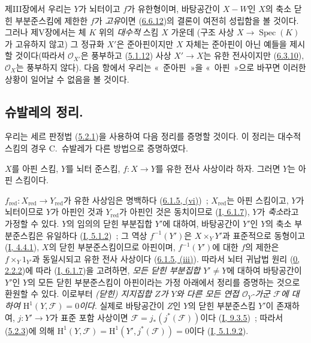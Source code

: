 \begin{remark}[6.6.13]
\label{II.6.6.13-ko}
제III장에서 우리는 $Y$가 뇌터이고 $f$가 유한형이며, 바탕공간이
$X-W$인 $X$의 축소 닫힌 부분준스킴에 제한한 $f$가 \emph{고유}이면
(\hyperref[II.6.6.12-ko]{6.6.12})의 결론이 여전히 성립함을 볼 것이다.
그러나 제V장에서는 체 $K$ 위의 \emph{대수적} 스킴 $X$ 가운데 (구조 사상
$X\to\operatorname{Spec}(K)$가 고유하지 않고) 그 정규화 $X'$은
준아핀이지만 $X$ 자체는 준아핀이 아닌 예들을 제시할 것이다(따라서
$\mathcal{O}_{X'}$은 풍부하고
(\hyperref[II.5.1.12-ko]{5.1.12}) 사상 $X'\to X$는 유한 전사이지만
(\hyperref[II.6.3.10-ko]{6.3.10}), $\mathcal{O}_X$는 풍부하지 않다).
다음 항에서 우리는 «~준아핀~»을 «~아핀~»으로 바꾸면 이러한 상황이
일어날 수 없음을 볼 것이다.
\end{remark}

\subsection{슈발레의 정리.}
\label{subsection:II.6.7-ko}

우리는 세르 판정법 (\hyperref[II.5.2.1-ko]{5.2.1})을 사용하여 다음
정리를 증명할 것이다. 이 정리는 대수적 스킴의 경우 C.~슈발레가 다른
방법으로 증명하였다.


\begin{theorem}[6.7.1]
\label{II.6.7.1-ko}
$X$를 아핀 스킴, $Y$를 뇌터 준스킴, $f:X\to Y$를 유한 전사 사상이라
하자. 그러면 $Y$는 아핀 스킴이다.
\end{theorem}

$f_{\mathrm{red}}:X_{\mathrm{red}}\to Y_{\mathrm{red}}$가 유한 사상임은
명백하다 (\hyperref[II.6.1.5-ko]{6.1.5, (vi)})~; $X_{\mathrm{red}}$는 아핀
스킴이고, $Y$가 뇌터이므로 $Y$가 아핀인 것과 $Y_{\mathrm{red}}$가 아핀인
것은 동치이므로 (\hyperref[I.6.1.7-ko]{I, 6.1.7}), $Y$가
\emph{축소}라고 가정할 수 있다. $Y$의 임의의 닫힌 부분집합 $Y'$에
대하여, 바탕공간이 $Y'$인 $Y$의 축소 부분준스킴은 유일하다
(\hyperref[I.5.1.2-ko]{I, 5.1.2})~; 그 역상 $f^{-1}(Y')$은
$X\times_Y Y'$과 표준적으로 동형이고
(\hyperref[I.4.4.1-ko]{I, 4.4.1}), $X$의 닫힌 부분준스킴이므로
아핀이며, $f^{-1}(Y')$에 대한 $f$의 제한은 $f\times_Y 1_{Y'}$과
동일시되고 유한 전사 사상이다
(\hyperref[II.6.1.5-ko]{6.1.5, (iii)}). 따라서 뇌터 귀납법 원리
(\hyperref[0.2.2.2-ko]{0, 2.2.2})에 따라
(\hyperref[I.6.1.7-ko]{I, 6.1.7})을 고려하면, \emph{모든 닫힌
부분집합 $Y'\neq Y$}에 대하여 바탕공간이 $Y'$인 $Y$의 모든 닫힌
부분준스킴이 아핀이라는 가정 아래에서 정리를 증명하는 것으로 환원할 수
있다. 이로부터 \emph{(닫힌) 지지집합 $Z$가 $Y$와 다른 모든 연접
$\mathcal{O}_Y$-가군 $\mathcal{F}$에 대하여
$\mathrm{H}^1(Y,\mathcal{F})=0$이다}. 실제로 바탕공간이 $Z$인 $Y$의
닫힌 부분준스킴 $Y'$이 존재하여, $j:Y'\to Y$가 표준 포함 사상이면
$\mathcal{F}=j_*(j^*(\mathcal{F}))$이다
(\hyperref[I.9.3.5-ko]{I, 9.3.5})~; 따라서
(\hyperref[II.5.2.3-ko]{5.2.3})에 의해
$\mathrm{H}^1(Y,\mathcal{F})
=\mathrm{H}^1(Y',j^*(\mathcal{F}))=0$이다
(\hyperref[I.5.1.9.2-ko]{I, 5.1.9.2}).

